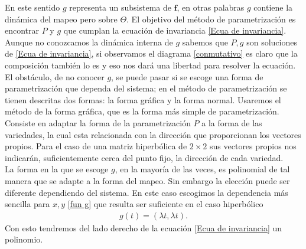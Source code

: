 En este sentido $g$ representa un subsistema de $\mathbf{f}$, en otras palabras $g$ contiene la dinámica del mapeo pero sobre $\Theta$. El objetivo del método de parametrización es encontrar $P$ y $g$ que cumplan la ecuación de invariancia \ref{Ecua de invariancia}. Aunque no conozcamos la dinámica interna de $g$ sabemos que $P,g$ son soluciones de \ref{Ecua de invariancia}, si observamos el diagrama \ref{conmutativo} es claro que la composición también lo es y eso nos dará una libertad para resolver la ecuación. El obstáculo, de no conocer $g$, se puede pasar si se escoge una forma de parametrización que dependa del sistema; en el método de parametrización se tienen descritas dos formas: la forma gráfica y la forma normal. Usaremos el método de la forma gráfica, que es la forma más simple de parametrización. Consiste en adaptar la forma de la parametrización $P$ a la forma de las variedades, la cual esta relacionada con la dirección que proporcionan los vectores propios. Para el caso de una matriz hiperbólica de $2\times 2$ sus vectores propios nos indicarán, suficientemente cerca del punto fijo, la dirección de cada variedad. \\


La forma en la que se escoge $g$, en la mayoría de las veces, es polinomial de tal manera que se adapte a la forma del mapeo. Sin embargo la elección puede ser diferente dependiendo del sistema. En este caso escogimos la dependencia más sencilla para $x,y$ \ref{fun g} que resulta ser suficiente en el caso hiperbólico
\begin{eqnarray}
g(t) = (\lambda t,\lambda t).
\label{fun g}
\end{eqnarray}
Con esto tendremos del lado derecho de la ecuación \ref{Ecua de invariancia} un polinomio. \\

